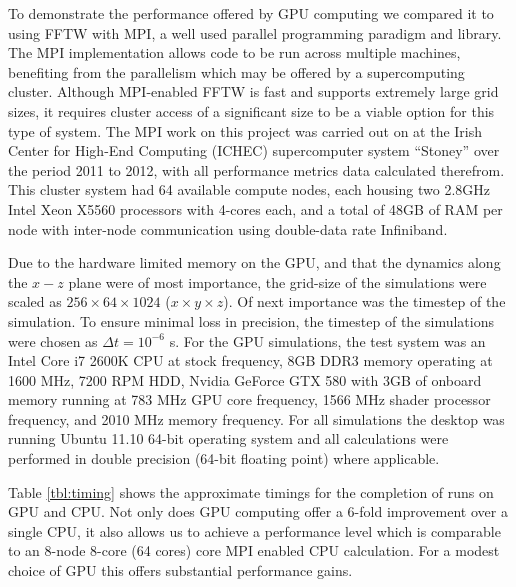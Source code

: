 To demonstrate the performance offered by GPU computing we compared it to using FFTW with MPI, a well used parallel programming paradigm and library. The MPI implementation allows code to be run across multiple machines, benefiting from the parallelism which may be offered by a supercomputing cluster. Although MPI-enabled FFTW is fast and supports extremely large grid sizes, it requires cluster access of a significant size to be a viable option for this type of system. The MPI work on this project was carried out on at the Irish Center for High-End Computing (ICHEC) supercomputer system ``Stoney'' \cite{https://www.ichec.ie/infrastructure/previous} over the period 2011 to 2012, with all performance metrics data calculated therefrom. This cluster system had 64 available compute nodes, each housing two 2.8GHz Intel Xeon X5560 processors with 4-cores each, and a total of 48GB of RAM per node with inter-node communication using double-data rate Infiniband.

Due to the hardware limited memory on the GPU, and that the dynamics along the $x-z$ plane were of most importance, the grid-size of the simulations were scaled as $256\times 64\times1024$ ($x\times y\times z$). Of next importance was the timestep of the simulation.  To ensure minimal loss in precision, the timestep of the simulations were chosen as $\Delta t = 10^{-6}$ s. For the GPU simulations, the test system was an Intel Core i7 2600K CPU at stock frequency, 8GB DDR3 memory operating at 1600 MHz, 7200 RPM HDD, Nvidia GeForce GTX 580 with 3GB of onboard memory running at 783 MHz GPU core frequency, 1566 MHz shader processor frequency, and 2010 MHz memory frequency. For all simulations the desktop was running Ubuntu 11.10 64-bit operating system and all calculations were performed in double precision (64-bit floating point) where applicable.

Table \ref{tbl:timing} shows the approximate timings for the completion of runs on GPU and CPU. Not only does GPU computing offer a 6-fold improvement over a single CPU, it also allows us to achieve a performance level which is comparable to an 8-node 8-core (64 cores) core MPI enabled CPU calculation. For a modest choice of GPU this offers substantial performance gains.

